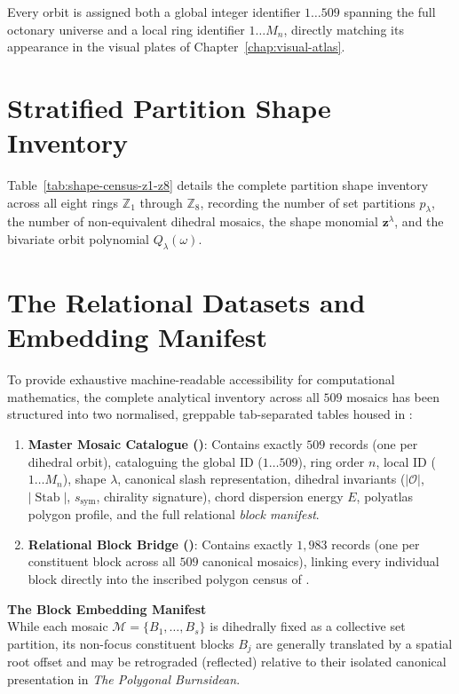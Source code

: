 Every orbit is assigned both a global integer identifier $1 \dots 509$ spanning the full octonary universe and a local ring identifier $1 \dots M_n$, directly matching its appearance in the visual plates of Chapter~\ref{chap:visual-atlas}.

\section{Stratified Partition Shape Inventory}

Table~\ref{tab:shape-census-z1-z8} details the complete partition shape inventory across all eight rings $\mathbb{Z}_1$ through $\mathbb{Z}_8$, recording the number of set partitions $p_\lambda$, the number of non-equivalent dihedral mosaics, the shape monomial $\mathbf{z}^\lambda$, and the bivariate orbit polynomial $Q_\lambda(\omega)$.



\section{The Relational Datasets and Embedding Manifest}
\label{sec:relational-datasets}

To provide exhaustive machine-readable accessibility for computational mathematics, the complete analytical inventory across all $509$ mosaics has been structured into two normalised, greppable tab-separated tables housed in :

\begin{enumerate}
    \item \textbf{Master Mosaic Catalogue ()}:
    Contains exactly $509$ records (one per dihedral orbit), cataloguing the global ID ($1 \dots 509$), ring order $n$, local ID ($1 \dots M_n$), shape $\lambda$, canonical slash representation, dihedral invariants ($|\mathcal{O}|$, $|\operatorname{Stab}|$, $s_{\text{sym}}$, chirality signature), chord dispersion energy $E$, polyatlas polygon profile, and the full relational \emph{block manifest}.
    
    \item \textbf{Relational Block Bridge ()}:
    Contains exactly $1{,}983$ records (one per constituent block across all $509$ canonical mosaics), linking every individual block directly into the inscribed polygon census of .
\end{enumerate}

\noindent\textbf{The Block Embedding Manifest}\\[0.4em]
While each mosaic $\mathcal{M} = \{B_1, \dots, B_s\}$ is dihedrally fixed as a collective set partition, its non-focus constituent blocks $B_j$ are generally translated by a spatial root offset and may be retrograded (reflected) relative to their isolated canonical presentation in \emph{The Polygonal Burnsidean}.

